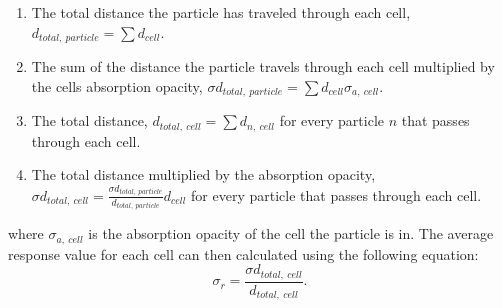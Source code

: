 \documentclass[]{article}
\begin{document}
	\begin{enumerate}
		\item The total distance the particle has traveled through each cell, $d_{total,~particle} = \sum d_{cell}$.
		\item The sum of the distance the particle travels through each cell multiplied by the cells absorption opacity, $\sigma d_{total,~particle} = \sum d_{cell} \sigma_{a,~cell}$.
		\item The total distance, $d_{total,~cell} = \sum d_{n,~cell}$ for every particle $n$ that passes through each cell.
		\item The total distance multiplied by the absorption opacity, $\sigma d_{total,~cell} = \frac{\sigma d_{total,~particle}}{d_{total,~particle}} d_{cell}$ for every particle that passes through each cell.
	\end{enumerate}
	where $\sigma_{a,~cell}$ is the absorption opacity of the cell the particle is in. The average response value for each cell can then calculated using the following equation:
	\begin{equation}
		\sigma_{r} = \frac{\sigma d_{total,~cell}}{d_{total,~cell}}.
	\end{equation}
  
\end{document}
